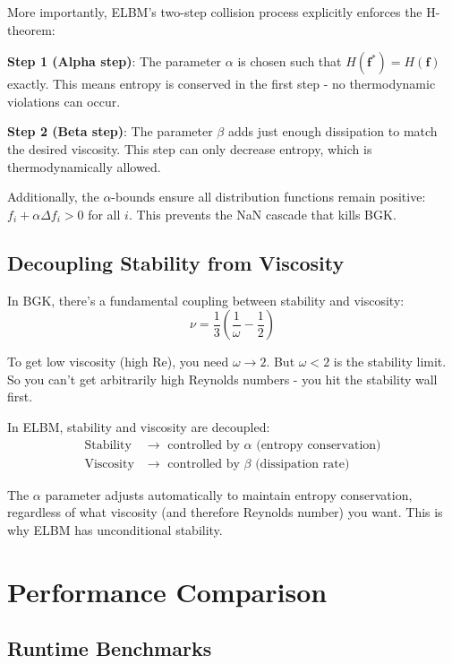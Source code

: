 More importantly, ELBM's two-step collision process explicitly enforces the H-theorem:

\textbf{Step 1 (Alpha step)}: The parameter $\alpha$ is chosen such that $H(\mathbf{f}^*) = H(\mathbf{f})$ exactly. This means entropy is conserved in the first step - no thermodynamic violations can occur.

\textbf{Step 2 (Beta step)}: The parameter $\beta$ adds just enough dissipation to match the desired viscosity. This step can only decrease entropy, which is thermodynamically allowed.

Additionally, the $\alpha$-bounds ensure all distribution functions remain positive: $f_i + \alpha \Delta f_i > 0$ for all $i$. This prevents the NaN cascade that kills BGK.

\subsection{Decoupling Stability from Viscosity}

In BGK, there's a fundamental coupling between stability and viscosity:
\begin{equation}
\nu = \frac{1}{3}\left(\frac{1}{\omega} - \frac{1}{2}\right)
\end{equation}

To get low viscosity (high Re), you need $\omega \rightarrow 2$. But $\omega < 2$ is the stability limit. So you can't get arbitrarily high Reynolds numbers - you hit the stability wall first.

In ELBM, stability and viscosity are decoupled:
\begin{align}
\text{Stability} &\rightarrow \text{ controlled by } \alpha \text{ (entropy conservation)} \\
\text{Viscosity} &\rightarrow \text{ controlled by } \beta \text{ (dissipation rate)}
\end{align}

The $\alpha$ parameter adjusts automatically to maintain entropy conservation, regardless of what viscosity (and therefore Reynolds number) you want. This is why ELBM has unconditional stability.

\section{Performance Comparison}

\subsection{Runtime Benchmarks}

